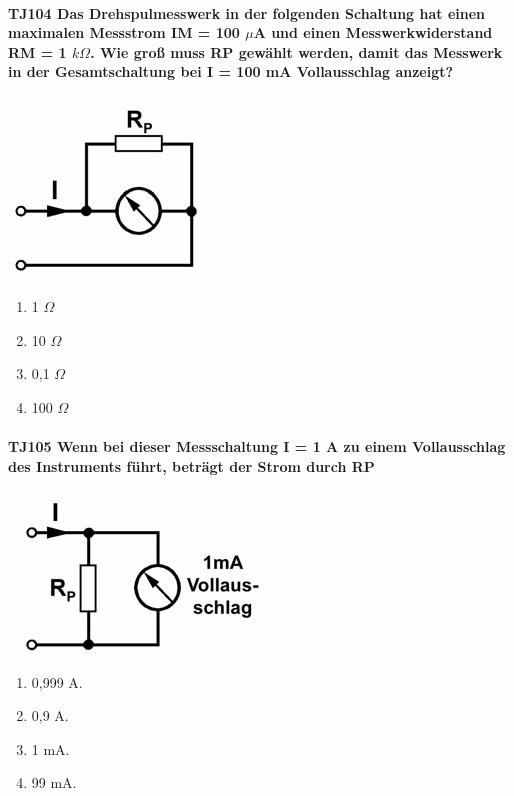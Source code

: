 \documentclass[8pt]{article}
\begin{document}
\paragraph*{TJ104 Das Drehspulmesswerk in der folgenden Schaltung hat einen maximalen Messstrom IM = 100 $\mu$A und einen Messwerkwiderstand RM = 1 $k\Omega$. Wie groß muss RP gewählt werden, damit das Messwerk in der Gesamtschaltung bei I = 100 mA Vollausschlag anzeigt?}
\begin{center}
	\begin{minipage}{\linewidth}
		\centering
		\includegraphics[scale=1.0]{pics/tj104_a.jpg}
	\end{minipage}
\end{center}
\begin{enumerate}[nolistsep,label=\Alph*]
\item 1 $\Omega$
\item 10 $\Omega$
\item 0,1 $\Omega$
\item 100 $\Omega$
\end{enumerate}

\paragraph*{TJ105 Wenn bei dieser Messschaltung I = 1 A zu einem Vollausschlag des Instruments führt, beträgt der Strom durch RP} 
\begin{center}
	\begin{minipage}{\linewidth}
		\centering
		\includegraphics[scale=1.0]{pics/tj105_a.jpg}
	\end{minipage}
\end{center}
\begin{enumerate}[nolistsep,label=\Alph*]
\item 0,999 A. 
\item 0,9 A.
\item 1 mA.
\item 99 mA.
\end{enumerate}
\end{document}
